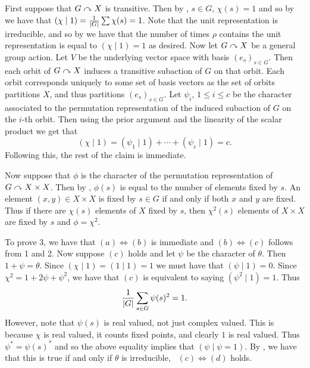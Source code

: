 \documentclass[letterpaper, 11pt, oneside]{book}
\begin{document}
\begin{pf}
  First suppose that $G \curvearrowright X$ is transitive.
  Then by , $s \in G$, $\chi(s) = 1$ and so by  we have that $(\chi \mid 1) = \frac{1}{\abs{G}} \sum \chi(s) = 1$.
  Note that the unit representation is irreducible, and so by  we have that the number of times $\rho$ contains the unit representation is equal to $(\chi \mid 1) = 1$ as desired.
  Now let $G \curvearrowright X$ be a general group action.
  Let $V$ be the underlying vector space with basis $(e_{s})_{s \in G}$.
  Then each orbit of $G \curvearrowright X$ induces a transitive subaction of $G$ on that orbit.
  Each orbit corresponds uniquely to some set of basis vectors as the set of orbits partitions $X$, and thus partitions $(e_{s})_{s \in G}$.
  Let $\psi_{i}$, $1 \leq i \leq c$ be the character associated to the permutation representation of the induced subaction of $G$ on the $i$-th orbit.
  Then using the prior argument and the linearity of the scalar product we get that
  \[
    (\chi \mid 1) = (\psi_{1} \mid 1) + \cdots + (\psi_{c} \mid 1) = c.
  \]
  Following this, the rest of the claim is immediate.

  Now suppose that $\phi$ is the character of the permutation representation of $G \curvearrowright X \times X$.
  Then by , $\phi(s)$ is equal to the number of elements fixed by $s$.
  An element $(x, y) \in X \times X$ is fixed by $s \in G$ if and only if both $x$ and $y$ are fixed.
  Thus if there are $\chi(s)$ elements of $X$ fixed by $s$, then $\chi^{2}(s)$ elements of $X \times X$ are fixed by $s$ and $\phi = \chi^{2}$.

  To prove 3, we have that $(a) \iff (b)$ is immediate and $(b) \iff (c)$ follows from 1 and 2.
  Now suppose $(c)$ holds and let $\psi$ be the character of $\theta$.
  Then $1 + \psi = \theta$.
  Since $(\chi \mid 1) = (1 \mid 1) = 1$ we must have that $(\psi \mid 1) = 0$.
  Since $\chi^{2} = 1 + 2\psi + \psi^{2}$, we have that $(c)$ is equivalent to saying $(\psi^{2} \mid 1) = 1$.
  Thus
  \[
    \frac{1}{\abs{G}} \sum_{s \in G} \psi(s)^{2} = 1.
  \]
  However, note that $\psi(s)$ is real valued, not just complex valued.
  This is because $\chi$ is real valued, it counts fixed points, and clearly $1$ is real valued.
  Thus $\psi^{*} = \psi(s)^{*}$ and so the above equality implies that $(\psi \mid \psi = 1)$.
  By , we have that this is true if and only if $\theta$ is irreducible, \ie\ $(c) \iff (d)$ holds.
\end{pf}

\printbibliography
\end{document}
